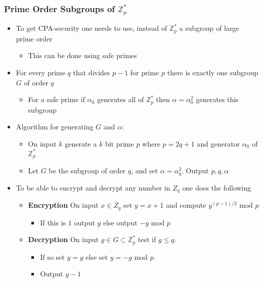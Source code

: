 \subsubsection{Prime Order Subgroups of $\mathbb Z_p^*$}
\begin{itemize}
  \item To get CPA-security one needs to use, instead of $\mathbb Z_p^*$ a subgroup of large prime order
  \begin{itemize}
  	\item This can be done using safe primes
  \end{itemize}
  \item For every prime $q$ that divides $p-1$ for prime $p$ there is exactly one subgroup $G$ of order $q$
  \begin{itemize}
  	\item For a safe prime if $\alpha_0$ generates all of $\mathbb Z_p^*$ then $\alpha = \alpha_0^2$ generates this subgroup
  \end{itemize}

  \item Algorithm for generating $G$ and $\alpha$:
  \begin{itemize}
	  \item On input $k$ generate a $k$ bit prime $p$ where $p = 2q +1$ and generator $\alpha _0$ of $\mathbb Z _ p^*$
	  \item Let $G$ be the subgroup of order $q$, and set $\alpha = \alpha_0^2$. Output $p,q,\alpha$
  \end{itemize}

  \item To be able to encrypt and decrypt any number in $Z_q$ one does the following
  \begin{itemize}
  	\item \textbf{Encryption} On input $x \in Z_q$ set $y=x+1$ and compute $y^{(p-1)/2} \text{ mod } p$
    \begin{itemize}
  		\item If this is $1$ output $y$ else output $-y \text{ mod } p$
    \end{itemize}
  	\item \textbf{Decryption} On input $g \in G \subset \mathbb Z_p^*$ test if $g \leq q$.
    \begin{itemize}
  		\item If so set $y=g$ else set $y = -g \text{ mod } p$.
  		\item Output $y-1$
    \end{itemize}
  \end{itemize}
\end{itemize}

